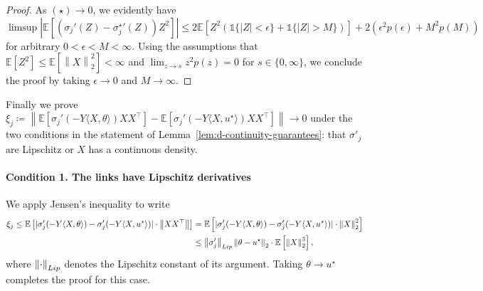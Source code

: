 \documentclass[11pt]{article}
\newcommand{\ind}{\mathds{1}}
\newcommand{\Ep}{\mathbb{E}}
\newcommand{\E}{\mathbb{E}}
\newcommand{\norm}[1]{\left\|{#1}\right\|} %
\newcommand{\ltwo}[1]{\norm{#1}_2} %
\newcommand{\<}{\langle} %
\renewcommand{\>}{\rangle}
\newcommand{\defeq}{\coloneqq}
\newcommand{\opt}{^\star}
\begin{document}
\begin{proof}
  As $(\star) \to 0$, we evidently have
  $\limsup |\E[(\sigma_j'(Z) - {\sigma_j\opt}'(Z)) Z^2]|
  \le 2 \E[Z^2 (\ind\{|Z| < \epsilon\} + \ind\{|Z| > M\})]
  + 2 (\epsilon^2 p(\epsilon) + M^2 p(M))$ for arbitrary
  $0 < \epsilon < M < \infty$.
  Using the assumptions that $\Ep[Z^2] \leq \Ep[\ltwo{X}^2] < \infty$
  and $\lim_{z \to s} z^2p(z) = 0$ for $s \in \{0, \infty\}$, we
  conclude the proof by taking $\epsilon \to 0$ and $M \to \infty$.
\end{proof}

Finally we prove $\xi_j \defeq \norm{\E[\sigma_j'(-Y\<X, \theta\>) XX^\top]
  - \E[\sigma_j'(-Y\<X, u\opt\>) XX^\top]} \to 0$ under the two conditions
in the statement of Lemma~\ref{lem:d-continuity-guarantees}: that
$\sigma'_j$ are Lipschitz or $X$ has a continuous density.
\paragraph{Condition 1. The links have Lipschitz derivatives}
We apply Jensen's inequality to write
\begin{align*}
  \xi_j \leq \E\left[|\sigma_j'(-Y\<X, \theta\>) - \sigma_j'(-Y\<X, u\opt\>)| \cdot \norm{XX^\top}\right]
  & = \E\left[|\sigma_j'(-Y\<X, \theta\>) - \sigma_j'(-Y\<X, u\opt\>)| \cdot \ltwo{X}^2\right] \\
  & \le \norm{\sigma_j'}_{\textup{Lip}}
  \ltwo{\theta - u\opt} \cdot \E\left[\ltwo{X}^3\right],
\end{align*}
where $\norm{\cdot}_{\textup{Lip}}$ denotes the Lipschitz
constant of its argument. Taking
$\theta \to u\opt$ completes the proof for this case.
\end{document}
